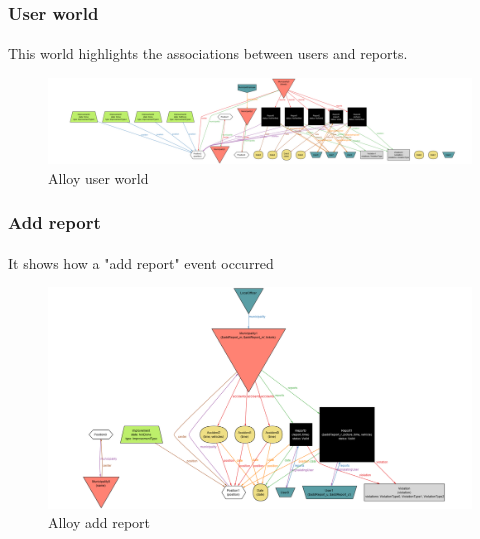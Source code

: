 			\subsubsection{User world}
				\paragraph{}
					This world highlights the associations between users and reports.
					\begin{figure}[!h]
						\includegraphics[width=\textwidth]{images/Alloy/UserWorld.png}
						\caption{Alloy user world}
					\end{figure}
			\subsubsection{Add report}
				\paragraph{}
					It shows how a "add report" event occurred
					\begin{figure}[!h]
						\includegraphics[width=\textwidth]{images/Alloy/AddReport.png}
						\caption{Alloy add report}
					\end{figure}
	